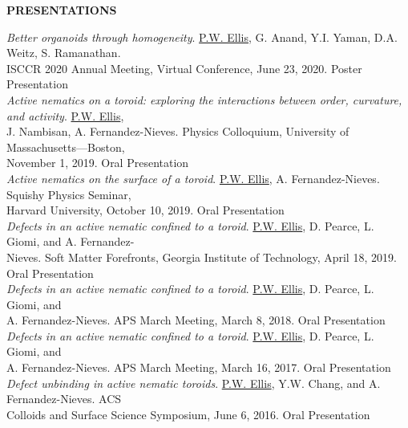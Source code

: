 \documentclass[10pt]{article}
\newenvironment{changemargin}[2]{%
  \list{}{\rightmargin#2\leftmargin#1
    \parsep=0pt\topsep=1pt\partopsep=0pt}
\item[]} {\endlist}
\newenvironment{indentmore}{\begin{changemargin}{10pt}{0cm}}{\end{changemargin}}
\begin{document}
\textbf{\large PRESENTATIONS}
\begin{indentmore}
\emph{Better organoids through homogeneity}. \underline{P.W. Ellis}, G. Anand, Y.I. Yaman, D.A. Weitz, S. Ramanathan. \\ \hspace*{15pt} ISCCR 2020 Annual Meeting, Virtual Conference, June 23, 2020. Poster Presentation\\

\emph{Active nematics on a toroid: exploring the interactions between order, curvature, and activity}. \underline{P.W. Ellis}, \\ \hspace*{15pt} J. Nambisan, A. Fernandez-Nieves. Physics Colloquium, University of Massachusetts---Boston, \\ \hspace*{15pt} November 1, 2019. Oral Presentation\\

\emph{Active nematics on the surface of a toroid}. \underline{P.W. Ellis}, A. Fernandez-Nieves. Squishy Physics Seminar, \\ \hspace*{15pt} Harvard University, October 10, 2019. Oral Presentation\\

\emph{Defects in an active nematic confined to a toroid}. \underline{P.W. Ellis}, D. Pearce, L. Giomi, and A. Fernandez- \\ \hspace*{15pt} Nieves. Soft Matter Forefronts, Georgia Institute of Technology, April 18, 2019. Oral Presentation\\

\emph{Defects in an active nematic confined to a toroid}. \underline{P.W. Ellis}, D. Pearce, L. Giomi, and \\ \hspace*{15pt} A. Fernandez-Nieves. APS March Meeting, March 8, 2018. Oral Presentation\\

\emph{Defects in an active nematic confined to a toroid}. \underline{P.W. Ellis}, D. Pearce, L. Giomi, and \\ \hspace*{15pt} A. Fernandez-Nieves. APS March Meeting, March 16, 2017. Oral Presentation\\

\emph{Defect unbinding in active nematic toroids}. \underline{P.W. Ellis}, Y.W. Chang, and A. Fernandez-Nieves. ACS\\ \hspace*{15pt} Colloids and Surface Science Symposium, June 6, 2016. Oral Presentation\\


\end{indentmore}
\end{document}
